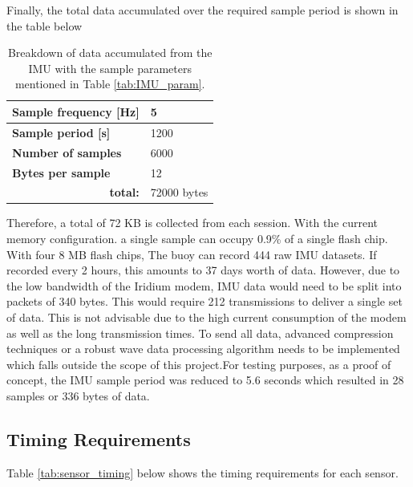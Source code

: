 Finally, the total data accumulated over the required sample period is shown in the table below

\begin{table}[H]
	\centering
	\caption{Breakdown of data accumulated from the IMU with the sample parameters mentioned in Table \ref{tab:IMU_param}.}
	\setlength{\extrarowheight}{5pt}
	\begin{tabular}{ll}
		\hline
		\textbf{Sample frequency [Hz] }    &  5\\
		\hline
		\textbf{Sample period [s]}       & 1200\\
		\hline
		\textbf{Number of samples}    & 6000 \\ 
		\hline
		\textbf{Bytes per sample}     & 12 \\
		\hline
		\multicolumn{1}{r}{\textbf{total:}} & \multicolumn{1}{l}{72000 bytes}\\
	\end{tabular}
	
	\label{tab:IMU_data_total}
\end{table}

Therefore, a total of 72 KB is collected from each session. With the current memory configuration. a single sample can occupy 0.9\% of a single flash chip. With four 8 MB flash chips, The buoy can record 444 raw IMU datasets. If recorded every 2 hours, this amounts to 37 days worth of data. However, due to the low bandwidth of the Iridium modem, IMU data would need to be split into packets of 340 bytes. This would require 212 transmissions to deliver a single set of data. This is not advisable due to the high current consumption of the modem as well as the long transmission times. To send all data, advanced compression techniques or a robust wave data processing algorithm needs to be implemented which falls outside the scope of this project.For testing purposes, as a proof of concept, the IMU sample period was reduced to 5.6 seconds which resulted in 28 samples or 336 bytes of data.

\subsection{Timing Requirements}
\label{subsec:ch5_timing}


Table \ref{tab:sensor_timing} below shows the timing requirements for each sensor.

